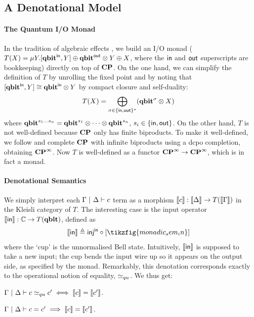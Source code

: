 \documentclass[sigplan, nonacm]{acmart}
\begin{document}
\subsection{A Denotational Model}
\paragraph{The Quantum I/O Monad} In the tradition of algebraic effects \cite{plotkin_power_2002,sums_tensors_HYLAND200670}, we build an I/O monad ($T(X) = \mu Y. [\mathbf{qbit}^{\mathsf{in}}, Y] \oplus \mathbf{qbit}^{\mathsf{out}} \otimes Y \oplus X$, where the $\mathsf{in}$ and $\mathsf{out}$ superscripts are bookkeeping) directly on top of $\mathbf{CP}$. On the one hand, we can simplify the definition of $T$ by unrolling the fixed point and by noting that $[\mathbf{qbit}^{\mathsf{in}}, Y] \cong \mathbf{qbit}^{\mathsf{in}} \otimes Y$ by compact closure and self-duality: 
\[
T (X) = \bigoplus_{\sigma \in \{\mathsf{in}, \mathsf{out}\}^*} (\mathbf{qbit}^{\sigma} \otimes X) 
\]
where $\mathbf{qbit}^{s_1...s_n} = \mathbf{qbit}^{s_1} \otimes \dots \otimes \mathbf{qbit}^{s_n}$, $s_i \in \{\mathsf{in}, \mathsf{out}\}$. On the other hand, $T$ is not well-defined because $\mathbf{CP}$ only has finite biproducts. To make it well-defined, we follow \cite{PaganiSV13} and complete $\mathbf{CP}$ with infinite biproducts using a dcpo completion, obtaining $\mathbf{CP}^\infty$. Now $T$ is well-defined as a functor $\mathbf{CP}^\infty \to \mathbf{CP}^\infty$, which is in fact a monad. 


\paragraph{Denotational Semantics} We simply interpret each $\Gamma \ | \ \Delta \vdash c$ term as a morphism $\llbracket c\rrbracket: \llbracket\Delta\rrbracket \to T(\llbracket\Gamma\rrbracket)$ in the Kleisli category of $T$. The interesting case is the input operator $\llbracket\mathsf{in}\rrbracket: \mathbb{C} \to T(\mathbf{qbit})$, defined as 
\[
   \sem{\opin} \eqdef \inj^{\opin} \circ \left[\tikzfig{monadic_sem_in}\right] 
\]
where the `cup' is the unnormalised Bell state. Intuitively, $\llbracket\mathsf{in}\rrbracket$ is supposed to take a new input; the cup bends the input wire up so it appears on the output side, as specified by the monad. Remarkably, this denotation corresponds exactly to the operational notion of equality, $\simeq_{qu}$. We thus get: 
\begin{theorem}
  \label{thm:adeqfullabs}
  $\Gamma \ | \ \Delta \vdash c \simeq_{qu} c' \iff \llbracket c\rrbracket = \llbracket c'\rrbracket$.
\end{theorem}
\begin{corollary}
  \label{thm:sounddensem}
  $\Gamma \ | \ \Delta \vdash c=c' \implies \llbracket c\rrbracket = \llbracket c'\rrbracket$.
\end{corollary}
\end{document}
